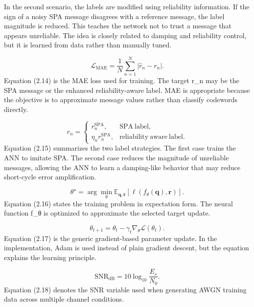 In the second scenario, the labels are modified using reliability information. If the sign of a noisy SPA message disagrees with a reference message, the label magnitude is reduced. This teaches the network not to trust a message that appears unreliable. The idea is closely related to damping and reliability control, but it is learned from data rather than manually tuned.

\begin{equation}
\mathcal{L}_{\mathrm{MAE}}=\frac{1}{N}\sum_{n=1}^{N}\left|\hat{r}_n-r_n\right|.
\end{equation}
Equation (2.14) is the MAE loss used for training. The target r\_n may be the SPA message or the enhanced reliability-aware label. MAE is appropriate because the objective is to approximate message values rather than classify codewords directly.

\begin{equation}
r_n=\begin{cases}r_n^{\mathrm{SPA}},&\mathrm{SPA\ label},\\ \eta_n r_n^{\mathrm{SPA}},&\mathrm{reliability\ aware\ label}.\end{cases}
\end{equation}
Equation (2.15) summarizes the two label strategies. The first case trains the ANN to imitate SPA. The second case reduces the magnitude of unreliable messages, allowing the ANN to learn a damping-like behavior that may reduce short-cycle error amplification.

\begin{equation}
\theta^{\star}=\arg\min_{\theta}\mathbb{E}_{\mathbf{q},\mathbf{r}}\left[\ell(f_{\theta}(\mathbf{q}),\mathbf{r})\right].
\end{equation}
Equation (2.16) states the training problem in expectation form. The neural function f\_θ is optimized to approximate the selected target update.

\begin{equation}
\theta_{t+1}=\theta_t-\gamma_t\nabla_{\theta}\mathcal{L}(\theta_t).
\end{equation}
Equation (2.17) is the generic gradient-based parameter update. In the implementation, Adam is used instead of plain gradient descent, but the equation explains the learning principle.

\begin{equation}
\mathrm{SNR}_{\mathrm{dB}}=10\log_{10}\frac{E_s}{N_0}.
\end{equation}
Equation (2.18) denotes the SNR variable used when generating AWGN training data across multiple channel conditions.


